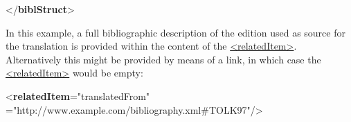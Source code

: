\begin{shaded}
\hspace*{1em}\mbox{}\newline 
{}\mbox{}\newline 
{</\textbf{biblStruct}>}\end{shaded}\egroup\par \noindent  In this example, a full bibliographic description of the edition used as source for the translation is provided within the content of the \hyperref[TEI.relatedItem]{<relatedItem>}. Alternatively this might be provided by means of a link, in which case the \hyperref[TEI.relatedItem]{<relatedItem>} would be empty: \par\bgroup{}\exampleFont \begin{shaded}\noindent\mbox{}{<\textbf{relatedItem}\hspace*{1em}{type}="{translatedFrom}"\mbox{}\newline 
\hspace*{1em}{target}="{http://www.example.com/bibliography.xml\#TOLK97}"/>}\end{shaded}\egroup\par 

